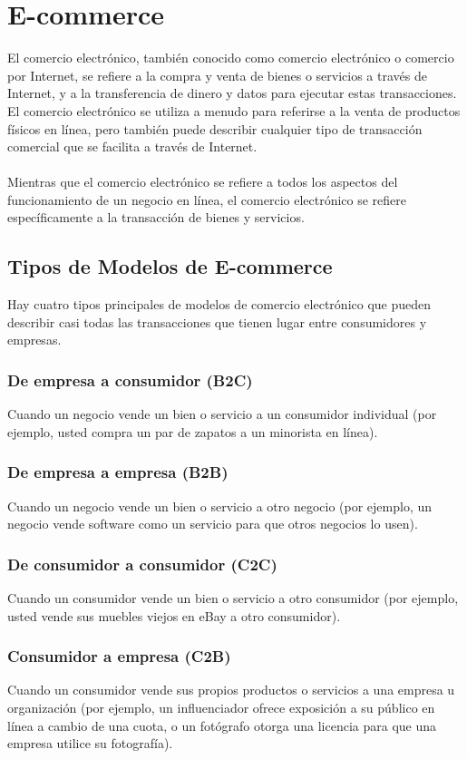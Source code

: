 \documentclass[12pt,letterpaper]{article}
\begin{document}
\newpage
\section{E-commerce}
El comercio electrónico, también conocido como comercio electrónico o comercio por Internet, 
se refiere a la compra y venta de bienes o servicios a través de Internet, y a la 
transferencia de dinero y datos para ejecutar estas transacciones. El comercio electrónico 
se utiliza a menudo para referirse a la venta de productos físicos en línea, pero también 
puede describir cualquier tipo de transacción comercial que se facilita a través de Internet.
\\ \\
Mientras que el comercio electrónico se refiere a todos los aspectos del funcionamiento de 
un negocio en línea, el comercio electrónico se refiere específicamente a la transacción de 
bienes y servicios.

\subsection{Tipos de Modelos de E-commerce}
Hay cuatro tipos principales de modelos de comercio electrónico que pueden describir casi 
todas las transacciones que tienen lugar entre consumidores y empresas.

\subsubsection{De empresa a consumidor (B2C)}
Cuando un negocio vende un bien o servicio a un consumidor individual (por ejemplo, usted 
compra un par de zapatos a un minorista en línea).

\subsubsection{De empresa a empresa (B2B)} 
Cuando un negocio vende un bien o servicio a otro negocio (por ejemplo, un negocio vende 
software como un servicio para que otros negocios lo usen).  

\subsubsection{De consumidor a consumidor (C2C)} 
Cuando un consumidor vende un bien o servicio a otro consumidor (por ejemplo, usted vende 
sus muebles viejos en eBay a otro consumidor).

\subsubsection{Consumidor a empresa (C2B)} 
Cuando un consumidor vende sus propios productos o servicios a una empresa u organización 
(por ejemplo, un influenciador ofrece exposición a su público en línea a cambio de una cuota, o un fotógrafo otorga una licencia para que una empresa utilice su fotografía).
\end{document}
